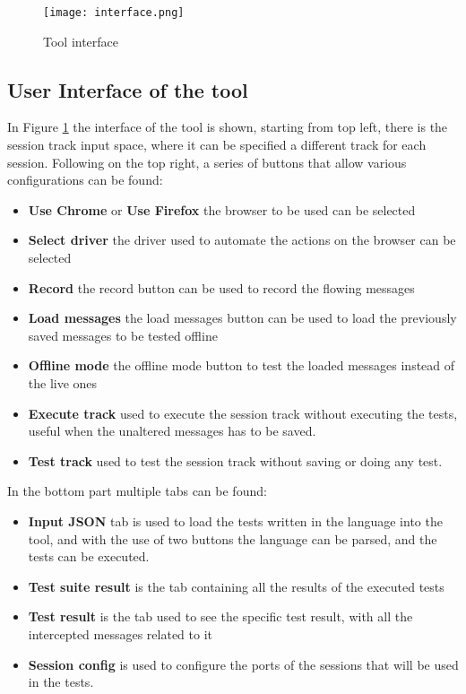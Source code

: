 \begin{figure}
    \texttt{[image: interface.png]}
    \caption{Tool interface}
    \label{fig:plugin_interface}
\end{figure}

\subsection{User Interface of the tool}
In Figure \ref{fig:plugin_interface} the interface of the tool is shown, starting from top left, there is the session track input space, where it can be specified a different track for each session. Following on the top right, a series of buttons that allow various configurations can be found:
\begin{itemize}
    \item \textbf{Use Chrome} or \textbf{Use Firefox} the browser to be used can be selected
    \item \textbf{Select driver} the driver used to automate the actions on the browser can be selected
    \item \textbf{Record} the record button can be used to record the flowing messages
    \item \textbf{Load messages} the load messages button can be used to load the previously saved messages to be tested offline
    \item \textbf{Offline mode} the offline mode button to test the loaded messages instead of the live ones
    \item \textbf{Execute track} used to execute the session track without executing the tests, useful when the unaltered messages has to be saved.
    \item \textbf{Test track} used to test the session track without saving or doing any test.
\end{itemize}

In the bottom part multiple tabs can be found:
\begin{itemize}
    \item \textbf{Input JSON} tab is used to load the tests written in the language into the tool, and with the use of two buttons the language can be parsed, and the tests can be executed.
    \item \textbf{Test suite result} is the tab containing all the results of the executed tests
    \item \textbf{Test result} is the tab used to see the specific test result, with all the intercepted messages related to it
    \item \textbf{Session config} is used to configure the ports of the sessions that will be used in the tests.
\end{itemize}

